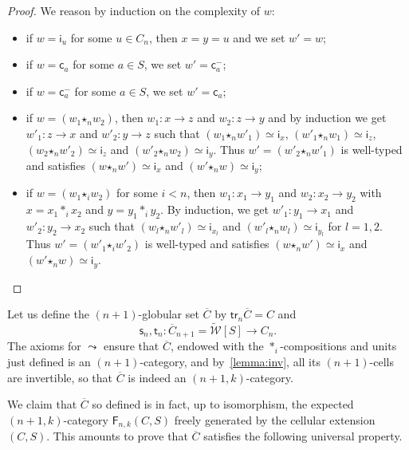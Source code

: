 \documentclass[reqno]{amsart}
\theoremstyle{plain}
\theoremstyle{definition}
\theoremstyle{remark}
\newcommand{\pair}[2]{(#1,#2)}       %
\newcommand{\source}{\mathsf{s}} %
\newcommand{\target}{\mathsf{t}} %
\newcommand{\functor}[1]{\mathsf{#1}} %
\newcommand{\trk}[1]{\functor{tr}_{#1}}%
\newcommand{\frf}[1]{\functor{F}_{#1}} %
\newcommand{\comp}[1]{\ast_{#1}} %
\newcommand{\sce}[1]{\source_{#1}} %
\newcommand{\tge}[1]{\target_{#1}} %
\newcommand{\clx}[2]{\pair{#1}{#2}}%
\newcommand{\WW}{\mathcal{W}}
\newcommand{\clWW}{\fcls{\WW}}
\newcommand{\wtxeq}[1]{\clWW[#1]} %
\newcommand{\formal}[1]{\mathsf{#1}} %
\newcommand{\fcst}[1]{\formal{c}_{#1}} %
\newcommand{\finv}[1]{\formal{c}^{\boldsymbol{-}}_{#1}}%
\newcommand{\fid}[1]{\formal{i}_{#1}} %
\newcommand{\fcomp}[1]{\bm{\star}_{#1}} %
\newcommand{\type}[3]{#1:#2\to #3} %
\newcommand{\frel}{\leadsto} %
\newcommand{\freq}{\simeq} %
\newcommand{\fcls}[1]{\widetilde{#1}}%
\newcommand{\extend}[1]{\overline{#1}} %
\begin{document}
  \begin{proof}
    We reason by induction on the complexity of $w$:
    \begin{itemize}
    \item if $w=\fid u$ for some $u\in C_n$, then $x=y=u$ and we set
      $w'=w$;
    \item if $w=\fcst a$ for some $a\in S$, we set $w'=\finv a$;
    \item if $w=\finv a$ for some $a\in S$, we set $w'=\fcst a$;
     \item if $w=(w_1\fcomp n w_2)$, then $\type{w_1}xz$ and
       $\type{w_2}zy$ and by induction we get $\type{w'_1}zx$ and
       $\type{w'_2}yz$ such that $(w_1\fcomp n w'_1)\freq \fid x$,
       $(w'_1\fcomp n w_1)\freq \fid z$, $(w_2\fcomp n w'_2)\freq \fid
       z$
       and $(w'_2\fcomp n w_2)\freq \fid y$. Thus $w'=(w'_2\fcomp n
       w'_1)$ is well-typed and satisfies $(w\fcomp n w')\freq \fid x$
       and $(w'\fcomp n w)\freq \fid y$;
       \item if $w=(w_1\fcomp i w_2)$ for some $i<n$, then
         $\type{w_1}{x_1}{y_1}$
         and $\type{w_2}{x_2}{y_2}$ with $x=x_1\comp i x_2$ and
         $y=y_1\comp i y_2$. By induction, we get
         $\type{w'_1}{y_1}{x_1}$ and $\type{w'_2}{y_2}{x_2}$ such that
         $(w_l\fcomp n w'_l)\freq \fid{x_l}$ and $(w'_l\fcomp n
         w_l)\freq \fid{y_l}$ for $l=1,2$. Thus $w'=(w'_1\fcomp i
         w'_2)$ is well-typed and satisfies $(w\fcomp n w')\freq \fid x$
       and $(w'\fcomp n w)\freq \fid y$.
    \end{itemize}
  \end{proof}
  Let us define the $(n{+}1)$-globular set $\extend C$ by
  $\trk n\extend C=C$ and \[\sce n,\tge n:\extend C_{n+1}=\wtxeq S\to C_n.\]
  The axioms for $\frel$ ensure that $\extend C$, endowed with
  the $\comp i$-compositions and units just defined is an
  $(n{+}1)$-category, and by~\cref{lemma:inv}, all its $(n{+}1)$-cells
  are invertible, so that $\extend C$ is
  indeed an
  $\pair{n{+}1}{k}$-category.
 

  We claim that $\extend C$ so defined is
  in fact, up to isomorphism, the expected $\pair{n{+}1}{k}$-category
  $\frf{n,k}\clx CS$ freely generated by the cellular extension $\clx CS$.
  This amounts to prove that $\extend C$ satisfies the following universal property.
  
\end{document}
